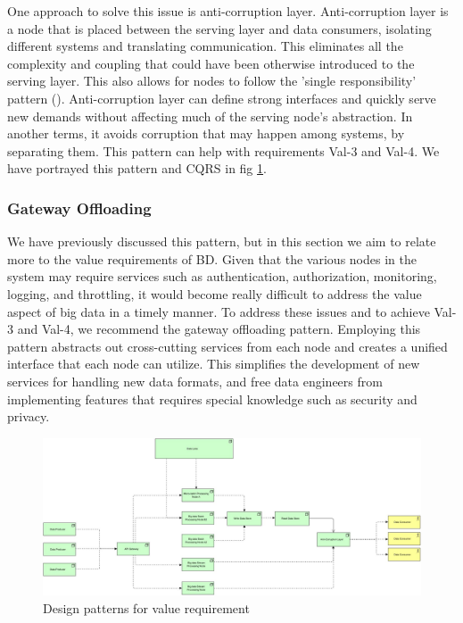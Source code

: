 \documentclass[conference]{IEEEtran}
\begin{document}
One approach to solve this issue is anti-corruption layer. Anti-corruption layer is a node that is placed between the serving layer and data consumers, isolating different systems and translating communication. This eliminates all the complexity and coupling that could have been otherwise introduced to the serving layer. This also allows for nodes to follow the 'single responsibility' pattern (\cite{gamma1995design}). Anti-corruption layer can define strong interfaces and quickly serve new demands without affecting much of the serving node's abstraction. In another terms, it avoids corruption that may happen among systems, by separating them. This pattern can help with requirements Val-3 and Val-4. We have portrayed this pattern and CQRS in fig \ref{fig:Value Requirements}.

\subsubsection{Gateway Offloading}

We have previously discussed this pattern, but in this section we aim to relate more to the value requirements of BD. Given that the various nodes in the system may require services such as authentication, authorization, monitoring, logging, and throttling, it would become really difficult to address the value aspect of big data in a timely manner. To address these issues and to achieve Val-3 and Val-4, we recommend the gateway offloading pattern. Employing this pattern abstracts out cross-cutting services from each node and creates a unified interface that each node can utilize. This simplifies the development of new services for handling new data formats, and free data engineers from implementing features that requires special knowledge such as security and privacy. 

\begin{figure}[h]
    \includegraphics[width=17cm]{../Media/Value Requirement.jpg}
    \caption[]{Design patterns for value requirement }
    \label{fig:Value Requirements}
\end{figure}
\end{document}
